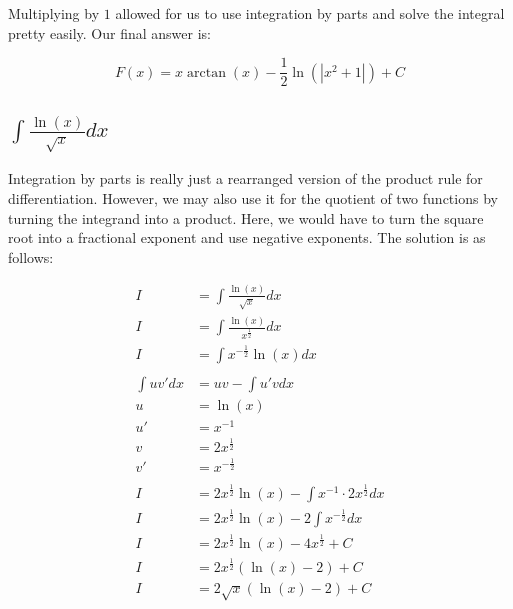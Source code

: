 \documentclass[12pt]{article}
\begin{document}
Multiplying by $1$ allowed for us to use integration by parts and solve the integral pretty easily.
Our final answer is:

$$
    F(x) = x\arctan(x) - \frac{1}{2} \ln(|x^2 + 1|) + C
$$

\subsection{$\int \frac{\ln(x)}{\sqrt{x}} dx$}

Integration by parts is really just a rearranged version of the product rule for differentiation.
However, we may also use it for the quotient of two functions by turning the integrand into a product.
Here, we would have to turn the square root into a fractional exponent and use negative exponents.
The solution is as follows:


\begin{align}
    I           & = \int \frac{\ln(x)}{\sqrt{x}} dx                                \\
    I           & = \int \frac{\ln(x)}{x^{\frac{1}{2}}} dx                         \\
    I           & = \int x^{-\frac{1}{2}} \ln(x) dx                                \\
    \nonumber                                                                      \\
    \int uv' dx & = uv - \int u'v dx                                               \\
    u           & = \ln(x)                                                         \\
    u'          & = x^{-1}                                                         \\
    v           & = 2x^{\frac{1}{2}}                                               \\
    v'          & = x^{-\frac{1}{2}}                                               \\
    \nonumber                                                                      \\
    I           & = 2x^{\frac{1}{2}}\ln(x) - \int x^{-1} \cdot 2x^{\frac{1}{2}} dx \\
    I           & = 2x^{\frac{1}{2}}\ln(x) - 2\int x^{-\frac{1}{2}} dx             \\
    I           & = 2x^{\frac{1}{2}}\ln(x) - 4x^{\frac{1}{2}} + C                  \\
    I           & = 2x^{\frac{1}{2}}(\ln(x) - 2) + C                               \\
    I           & = 2\sqrt{x}(\ln(x) - 2) + C
\end{align}
\end{document}
